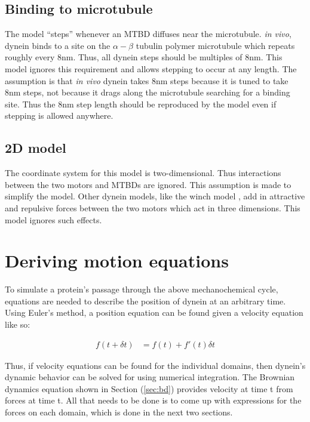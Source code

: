 \documentclass[
11pt, %
english, %
singlespacing, %
headsepline, %
chapterinoneline, %
]{MastersDoctoralThesis} %
\begin{document}
\subsection{Binding to microtubule}
The model ``steps'' whenever an MTBD diffuses near the microtubule. \textit{in vivo}, dynein binds to a site on the $\alpha-\beta$ tubulin polymer microtubule which repeats roughly every 8nm. Thus, all dynein steps should be multiples of $8$nm. This model ignores this requirement and allows stepping to occur at any length. The assumption is that \textit{in vivo} dynein takes 8nm steps because it is tuned to take 8nm steps, not because it drags along the microtubule searching for a binding site. Thus the 8nm step length should be reproduced by the model even if stepping is allowed anywhere.\\

\subsection{2D model}
The coordinate system for this model is two-dimensional. Thus interactions between the two motors and MTBDs are ignored. This assumption is made to simplify the model. Other dynein models, like the winch model \cite{sarlahmodel}, add in attractive and repulsive forces between the two motors which act in three dimensions. This model ignores such effects.\\

\section{Deriving motion equations}
To simulate a protein's passage through the above mechanochemical cycle, equations are needed to describe the position of dynein at an arbitrary time. Using Euler's method, a position equation can be found given a velocity equation like so:

\begin{align}
  f(t+\delta t) &= f(t)+f'(t)\delta t
\end{align}

Thus, if velocity equations can be found for the individual domains, then dynein's dynamic behavior can be solved for using numerical integration. The Brownian dynamics equation shown in Section (\ref{sec:bd}) provides velocity at time t from forces at time t. All that needs to be done is to come up with expressions for the forces on each domain, which is done in the next two sections.\\
\end{document}
